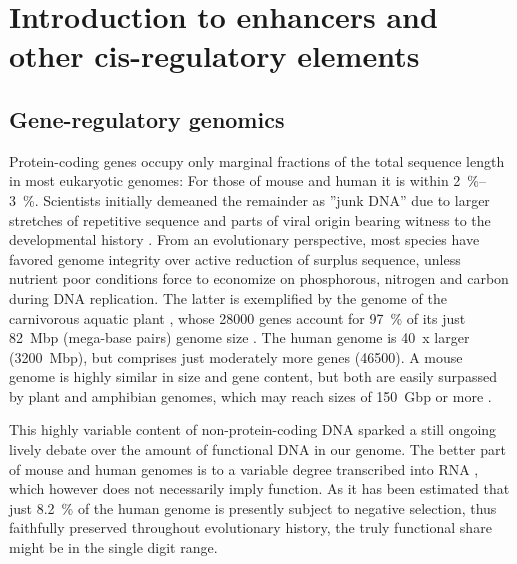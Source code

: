 \chapter{Introduction to enhancers and other cis-regulatory elements}
\section{Gene-regulatory genomics}
\label{chap:i:enhancers:regulatorygenomics}

Protein-coding genes occupy only marginal fractions of the total sequence length in most eukaryotic genomes\cite{bookshelf-eukaryotic-genomes}: For those of mouse and human it is within \SIrange{2}{3}{\percent}. Scientists initially demeaned the remainder as ''junk DNA'' due to larger stretches of repetitive sequence and parts of viral origin bearing witness to the developmental history \cite{Makalowski2000,Palazzo2014}. From an evolutionary perspective, most species have favored genome integrity over active reduction of surplus sequence, unless nutrient poor conditions force to economize on phosphorous, nitrogen and carbon during DNA replication. The latter is exemplified by the genome of the carnivorous aquatic plant , whose \num{28000} genes account for \SI{97}{\percent} of its just \SI{82}{\mega bp} (mega-base pairs) genome size \cite{Ibarra-Laclette2013,Carretero-Paulet2015}. The human genome is \SI{40}{x} larger (\SI{3200}{\mega bp}), but comprises just moderately more genes (\num{46500}). A mouse genome is highly similar in size and gene content, but both are easily surpassed by plant and amphibian genomes, which may reach sizes of \SI{150}{\giga bp} or more \cite{Dufresne2011}.

This highly variable content of non-protein-coding DNA sparked a still ongoing lively debate over the amount of functional DNA in our genome\cite{Graur2013,Doolittle2013,Niu2013}. The better part of mouse and human genomes is to a variable degree transcribed into RNA \cite{Carninci2005,Djebali2012}, which however does not necessarily imply function\cite{Palazzo2015}. As it has been estimated that just \SI{8.2}{\percent} of the human genome is presently subject to negative selection\cite{Rands2014}, thus faithfully preserved throughout evolutionary history, the truly functional share might be in the single digit range. 

